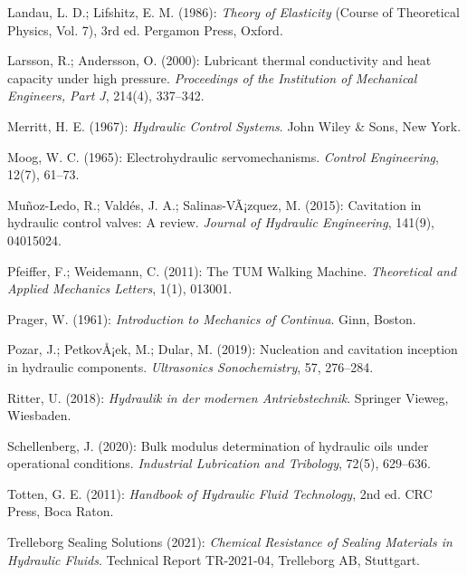 ﻿\documentclass[a4paper,12pt]{scrreprt}
\theoremstyle{definition}
\begin{document}
\begin{enumerate}[label={[\arabic*]}]
  \item Landau, L. D.; Lifshitz, E. M. (1986): \textit{Theory of
    Elasticity} (Course of Theoretical Physics, Vol. 7), 3rd ed.
    Pergamon Press, Oxford.

  \item Larsson, R.; Andersson, O. (2000): Lubricant thermal
    conductivity and heat capacity under high pressure.
    \textit{Proceedings of the Institution of Mechanical Engineers,
    Part J}, 214(4), 337--342.

  \item Merritt, H. E. (1967): \textit{Hydraulic Control Systems}.
    John Wiley \& Sons, New York.

  \item Moog, W. C. (1965): Electrohydraulic servomechanisms.
    \textit{Control Engineering}, 12(7), 61--73.

  \item Muñoz-Ledo, R.; Valdés, J. A.; Salinas-VÃ¡zquez, M. (2015):
    Cavitation in hydraulic control valves: A review.
    \textit{Journal of Hydraulic Engineering}, 141(9), 04015024.

  \item Pfeiffer, F.; Weidemann, C. (2011): The TUM Walking Machine.
    \textit{Theoretical and Applied Mechanics Letters}, 1(1), 013001.

  \item Prager, W. (1961): \textit{Introduction to Mechanics of
    Continua}. Ginn, Boston.

  \item Pozar, J.; PetkovÅ¡ek, M.; Dular, M. (2019): Nucleation and
    cavitation inception in hydraulic components. \textit{Ultrasonics
    Sonochemistry}, 57, 276--284.

  \item Ritter, U. (2018): \textit{Hydraulik in der modernen
    Antriebstechnik}. Springer Vieweg, Wiesbaden.

  \item Schellenberg, J. (2020): Bulk modulus determination of
    hydraulic oils under operational conditions.
    \textit{Industrial Lubrication and Tribology}, 72(5), 629--636.

  \item Totten, G. E. (2011): \textit{Handbook of Hydraulic Fluid
    Technology}, 2nd ed. CRC Press, Boca Raton.

  \item Trelleborg Sealing Solutions (2021): \textit{Chemical
    Resistance of Sealing Materials in Hydraulic Fluids}.
    Technical Report TR-2021-04, Trelleborg AB, Stuttgart.


\end{enumerate}
\end{document}
